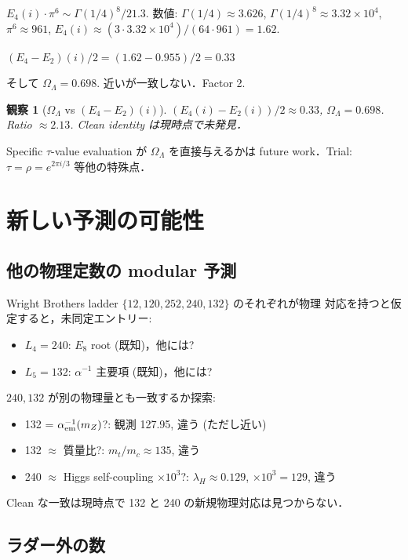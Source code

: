 \documentclass[11pt,a4paper]{article}
\newtheorem{observation}{観察}
\begin{document}
$E_4(i) \cdot \pi^6 \sim \Gamma(1/4)^8 / 21.3$. 数値: $\Gamma(1/4) \approx 3.626$,
$\Gamma(1/4)^8 \approx 3.32 \times 10^4$, $\pi^6 \approx 961$,
$E_4(i) \approx (3 \cdot 3.32 \times 10^4)/(64 \cdot 961) = 1.62$.

$(E_4 - E_2)(i)/2 = (1.62 - 0.955)/2 = 0.33$

そして $\Omega_\Lambda = 0.698$. 近いが一致しない．Factor 2.

\begin{observation}[$\Omega_\Lambda$ vs $(E_4 - E_2)(i)$]
$(E_4(i) - E_2(i))/2 \approx 0.33$, $\Omega_\Lambda = 0.698$.
Ratio $\approx 2.13$. Clean identity は現時点で未発見．
\end{observation}

Specific $\tau$-value evaluation が $\Omega_\Lambda$ を直接与えるかは
future work．Trial: $\tau = \rho = e^{2\pi i/3}$ 等他の特殊点．

\section{新しい予測の可能性}

\subsection{他の物理定数の modular 予測}

Wright Brothers ladder $\{12, 120, 252, 240, 132\}$ のそれぞれが物理
対応を持つと仮定すると，未同定エントリー:
\begin{itemize}
\item $L_4 = 240$: $E_8$ root (既知)，他には?
\item $L_5 = 132$: $\alpha^{-1}$ 主要項 (既知)，他には?
\end{itemize}

$240, 132$ が別の物理量とも一致するか探索:
\begin{itemize}
\item 132 = $\alpha_{\rm em}^{-1}(m_Z)$?: 観測 127.95, 違う (ただし近い)
\item 132 $\approx$ 質量比?: $m_t/m_c \approx 135$, 違う
\item 240 $\approx$ Higgs self-coupling $\times 10^3$?: $\lambda_H \approx 0.129$, $\times 10^3 = 129$, 違う
\end{itemize}

Clean な一致は現時点で 132 と 240 の新規物理対応は見つからない．

\subsection{ラダー外の数}
\end{document}
